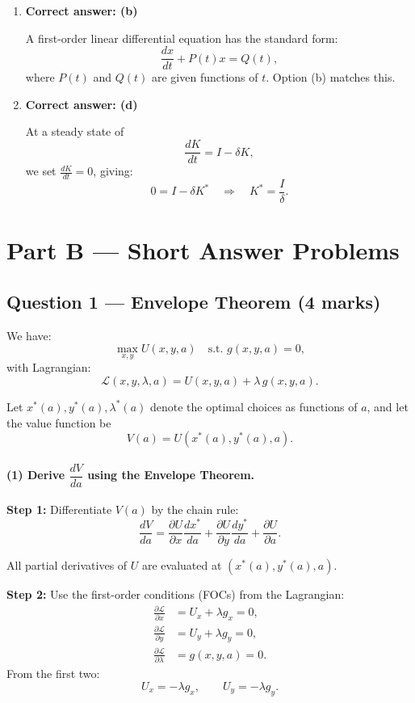 \documentclass[12pt]{article}
\begin{document}
\begin{enumerate}
$\int_0^T I(t)\,dt$ is the continuous-time sum (integral) of the investment flow $I(t)$ between 0 and $T$. It therefore represents the \emph{total accumulated investment} over $[0,T]$.

\item \textbf{Correct answer: (b)}  

A first-order linear differential equation has the standard form:
\[
\frac{dx}{dt} + P(t)x = Q(t),
\]
where $P(t)$ and $Q(t)$ are given functions of $t$. Option (b) matches this.

\item \textbf{Correct answer: (d)}  

At a steady state of 
\[
\frac{dK}{dt} = I - \delta K,
\]
we set $\frac{dK}{dt} = 0$, giving:
\[
0 = I - \delta K^* \quad \Rightarrow \quad K^* = \frac{I}{\delta}.
\]

\end{enumerate}

\newpage

\section*{Part B — Short Answer Problems}

\subsection*{Question 1 — Envelope Theorem (4 marks)}

We have:
\[
\max_{x,y} U(x,y,a) \quad \text{s.t. } g(x,y,a) = 0,
\]
with Lagrangian:
\[
\mathcal{L}(x,y,\lambda,a) = U(x,y,a) + \lambda \, g(x,y,a).
\]

Let $x^*(a), y^*(a), \lambda^*(a)$ denote the optimal choices as functions of $a$, and let the value function be
\[
V(a) = U(x^*(a), y^*(a), a).
\]

\paragraph{(1) Derive $\dfrac{dV}{da}$ using the Envelope Theorem.}

\textbf{Step 1:} Differentiate $V(a)$ by the chain rule:
\[
\frac{dV}{da}
= \frac{\partial U}{\partial x}\frac{dx^*}{da}
+ \frac{\partial U}{\partial y}\frac{dy^*}{da}
+ \frac{\partial U}{\partial a}.
\]

All partial derivatives of $U$ are evaluated at $(x^*(a),y^*(a),a)$.

\textbf{Step 2:} Use the first-order conditions (FOCs) from the Lagrangian:
\begin{align*}
\frac{\partial \mathcal{L}}{\partial x} &= U_x + \lambda g_x = 0,\\
\frac{\partial \mathcal{L}}{\partial y} &= U_y + \lambda g_y = 0,\\
\frac{\partial \mathcal{L}}{\partial \lambda} &= g(x,y,a) = 0.
\end{align*}
From the first two:
\[
U_x = -\lambda g_x, \qquad U_y = -\lambda g_y.
\]
\end{document}
